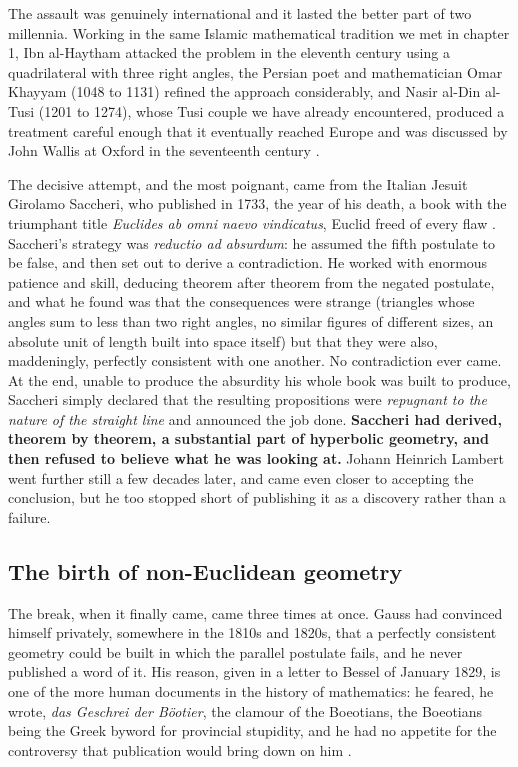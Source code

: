         The assault was genuinely international and it lasted the better part of two millennia. Working in the same Islamic mathematical tradition we met in chapter 1, Ibn al-Haytham attacked the problem in the eleventh century using a quadrilateral with three right angles, the Persian poet and mathematician Omar Khayyam (1048 to 1131) refined the approach considerably, and Nasir al-Din al-Tusi (1201 to 1274), whose Tusi couple we have already encountered, produced a treatment careful enough that it eventually reached Europe and was discussed by John Wallis at Oxford in the seventeenth century \citep{kline1972}.

        The decisive attempt, and the most poignant, came from the Italian Jesuit Girolamo Saccheri, who published in 1733, the year of his death, a book with the triumphant title \textit{Euclides ab omni naevo vindicatus}, Euclid freed of every flaw \citep{saccheri1733}. Saccheri's strategy was \textit{reductio ad absurdum}: he assumed the fifth postulate to be false, and then set out to derive a contradiction. He worked with enormous patience and skill, deducing theorem after theorem from the negated postulate, and what he found was that the consequences were strange (triangles whose angles sum to less than two right angles, no similar figures of different sizes, an absolute unit of length built into space itself) but that they were also, maddeningly, perfectly consistent with one another. No contradiction ever came. At the end, unable to produce the absurdity his whole book was built to produce, Saccheri simply declared that the resulting propositions were \textit{repugnant to the nature of the straight line} and announced the job done. \textbf{Saccheri had derived, theorem by theorem, a substantial part of hyperbolic geometry, and then refused to believe what he was looking at.} Johann Heinrich Lambert went further still a few decades later, and came even closer to accepting the conclusion, but he too stopped short of publishing it as a discovery rather than a failure.

    \subsection{The birth of non-Euclidean geometry}

        The break, when it finally came, came three times at once. Gauss had convinced himself privately, somewhere in the 1810s and 1820s, that a perfectly consistent geometry could be built in which the parallel postulate fails, and he never published a word of it. His reason, given in a letter to Bessel of January 1829, is one of the more human documents in the history of mathematics: he feared, he wrote, \textit{das Geschrei der Böotier}, the clamour of the Boeotians, the Boeotians being the Greek byword for provincial stupidity, and he had no appetite for the controversy that publication would bring down on him \citep{kline1972}.


